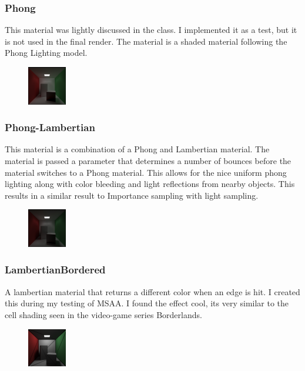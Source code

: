 \documentclass{article}
\begin{document}
        \subsubsection{Phong}
        This material was lightly discussed in the class. I implemented it as a test, but it is not used in the final render. The material is a shaded material following the Phong Lighting model. \par
        \begin{figure}[h!]
            \centering
            \includegraphics[width=0.15\textwidth]{samples/Phong1bnc50000spls512p.png}
        \end{figure}


        \subsubsection{Phong-Lambertian}
        This material is a combination of a Phong and Lambertian material. The material is passed a parameter that determines a number of bounces before the material switches to a Phong material. This allows for the nice uniform phong lighting along with color bleeding and light reflections from nearby objects. This results in a similar result to Importance sampling with light sampling.\par
        \begin{figure}[h!]
            \centering
            \includegraphics[width=0.15\textwidth]{samples/4k5000s2bnc.jpg}
        \end{figure}

        
        \subsubsection{LambertianBordered}
        A lambertian material that returns a different color when an edge is hit. I created this during my testing of MSAA. I found the effect cool, its very similar to the cell shading seen in the video-game series Borderlands.\par
        \begin{figure}[h!]
            \centering
            \includegraphics[width=0.15\textwidth]{samples/lambertianBorderedCornell.png}
        \end{figure}
\end{document}
